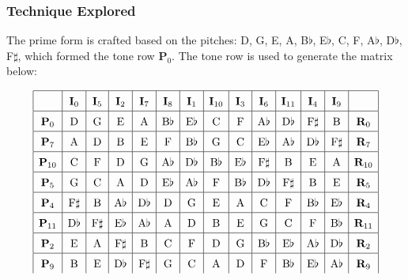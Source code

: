 \documentclass{article}
\begin{document}
\subsubsection{Technique Explored}

The prime form is crafted based on the pitches: D, G, E, A, B\(\flat\), E\(\flat\), C, F, A\(\flat\), D\(\flat\), F\(\sharp\), which formed the tone row \(\mathbf P_0\). The tone row is used to generate the matrix below:

\[\def\arraystretch{1.5}
\begin{array}{|c|c|c|c|c|c|c|c|c|c|c|c|c|c|}
\hline
&\mathbf{I}_0&\mathbf{I}_5&\mathbf{I}_2&\mathbf{I}_7&\mathbf{I}_8&\mathbf{I}_1&\mathbf{I}_{10}&\mathbf{I}_3&\mathbf{I}_6&\mathbf{I}_{11}&\mathbf{I}_4&\mathbf{I}_9&\\
\hline
\mathbf{P}_0&\mathrm{D}&\mathrm{G}&\mathrm{E}&\mathrm{A}&\mathrm{B}\flat&\mathrm{E}\flat&\mathrm{C}&\mathrm{F}&\mathrm{A}\flat&\mathrm{D}\flat&\mathrm{F}\sharp&\mathrm{B}&\mathbf{R}_0\\
\hline
\mathbf{P}_7&\mathrm{A}&\mathrm{D}&\mathrm{B}&\mathrm{E}&\mathrm{F}&\mathrm{B}\flat&\mathrm{G}&\mathrm{C}&\mathrm{E}\flat&\mathrm{A}\flat&\mathrm{D}\flat&\mathrm{F}\sharp&\mathbf{R}_7\\
\hline
\mathbf{P}_{10}&\mathrm{C}&\mathrm{F}&\mathrm{D}&\mathrm{G}&\mathrm{A}\flat&\mathrm{D}\flat&\mathrm{B}\flat&\mathrm{E}\flat&\mathrm{F}\sharp&\mathrm{B}&\mathrm{E}&\mathrm{A}&\mathbf{R}_{10}\\
\hline
\mathbf{P}_5&\mathrm{G}&\mathrm{C}&\mathrm{A}&\mathrm{D}&\mathrm{E}\flat&\mathrm{A}\flat&\mathrm{F}&\mathrm{B}\flat&\mathrm{D}\flat&\mathrm{F}\sharp&\mathrm{B}&\mathrm{E}&\mathbf{R}_5\\
\hline
\mathbf{P}_4&\mathrm{F}\sharp&\mathrm{B}&\mathrm{A}\flat&\mathrm{D}\flat&\mathrm{D}&\mathrm{G}&\mathrm{E}&\mathrm{A}&\mathrm{C}&\mathrm{F}&\mathrm{B}\flat&\mathrm{E}\flat&\mathbf{R}_4\\
\hline
\mathbf{P}_{11}&\mathrm{D}\flat&\mathrm{F}\sharp&\mathrm{E}\flat&\mathrm{A}\flat&\mathrm{A}&\mathrm{D}&\mathrm{B}&\mathrm{E}&\mathrm{G}&\mathrm{C}&\mathrm{F}&\mathrm{B}\flat&\mathbf{R}_{11}\\
\hline
\mathbf{P}_2&\mathrm{E}&\mathrm{A}&\mathrm{F}\sharp&\mathrm{B}&\mathrm{C}&\mathrm{F}&\mathrm{D}&\mathrm{G}&\mathrm{B}\flat&\mathrm{E}\flat&\mathrm{A}\flat&\mathrm{D}\flat&\mathbf{R}_2\\
\hline
\mathbf{P}_9&\mathrm{B}&\mathrm{E}&\mathrm{D}\flat&\mathrm{F}\sharp&\mathrm{G}&\mathrm{C}&\mathrm{A}&\mathrm{D}&\mathrm{F}&\mathrm{B}\flat&\mathrm{E}\flat&\mathrm{A}\flat&\mathbf{R}_9\\

\end{array}\]
\end{document}
